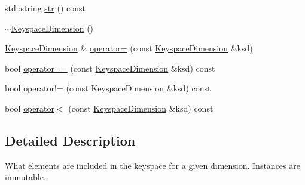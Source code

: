 \begin{DoxyCompactItemize}
\item 
std::string \hyperlink{classBUSBOY_1_1KeyspaceDimension_afb55c8f67a2a21953231462d788e2e60}{str} () const 
\item 
\hyperlink{classBUSBOY_1_1KeyspaceDimension_a8bd7f67bb399d7cf9b80be6160e7daf7}{$\sim$KeyspaceDimension} ()
\item 
\hyperlink{classBUSBOY_1_1KeyspaceDimension}{KeyspaceDimension} \& \hyperlink{classBUSBOY_1_1KeyspaceDimension_aac917a01e31957456ef0e90f924bfdf5}{operator=} (const \hyperlink{classBUSBOY_1_1KeyspaceDimension}{KeyspaceDimension} \&ksd)
\item 
bool \hyperlink{classBUSBOY_1_1KeyspaceDimension_a5527508b97f03a40e09ce3fd871942db}{operator==} (const \hyperlink{classBUSBOY_1_1KeyspaceDimension}{KeyspaceDimension} \&ksd) const 
\item 
bool \hyperlink{classBUSBOY_1_1KeyspaceDimension_a22b8802999a801a96b9da7968753c636}{operator!=} (const \hyperlink{classBUSBOY_1_1KeyspaceDimension}{KeyspaceDimension} \&ksd) const 
\item 
bool \hyperlink{classBUSBOY_1_1KeyspaceDimension_aa1e0960c0f20c7eeeac9a458e2675281}{operator$<$} (const \hyperlink{classBUSBOY_1_1KeyspaceDimension}{KeyspaceDimension} \&ksd) const 
\end{DoxyCompactItemize}


\subsection{Detailed Description}
What elements are included in the keyspace for a given dimension. Instances are immutable. 

